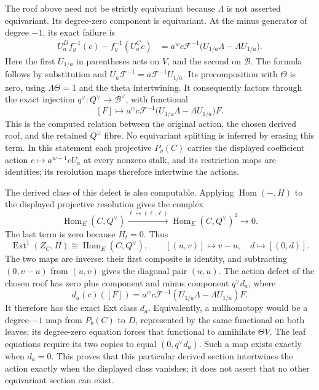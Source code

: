 The roof above need not be strictly equivariant because \(\Lambda\) is
not asserted equivariant. Its degree-zero component is equivariant. At
the minus generator of degree \(-1\), its exact failure is \[
\begin{aligned}
U_a^{D}f_y^{-1}(c)-f_y^{-1}(U_a^{C}c)
&=a^w c\mathcal F^{-1}
\bigl(U_{1/a}\Lambda-\Lambda U_{1/a}\bigr).
\end{aligned}
\] Here the first \(U_{1/a}\) in parentheses acts on \(V\), and the
second on \(\mathscr B\). The formula follows by substitution and
\(U_a\mathcal F^{-1}=a\mathcal F^{-1}U_{1/a}\). Its precomposition with
\(\Theta\) is zero, using \(\Lambda\Theta=1\) and the theta
intertwining. It consequently factors through the exact injection
\(q^\vee:Q^\vee\to\mathscr B^\vee\), with functional \[
[F]\longmapsto a^w c\mathcal F^{-1}
\bigl(U_{1/a}\Lambda-\Lambda U_{1/a}\bigr)F.
\] This is the computed relation between the original action, the chosen
derived roof, and the retained \(Q^\vee\) fibre. No equivariant
splitting is inferred by erasing this term. In this statement each
projective \(P_v(C)\) carries the displayed coefficient action
\(c\mapsto a^{w-1}cU_a\) at every nonzero stalk, and its restriction
maps are identities; its resolution maps therefore intertwine the
actions.

The derived class of this defect is also computable. Applying
\(\operatorname{Hom}(-,H)\) to the displayed projective resolution gives
the complex \[
\operatorname{Hom}_E(C,Q^\vee)
\xrightarrow{\ell\mapsto(\ell,\ell)}
\operatorname{Hom}_E(C,Q^\vee)^2
\longrightarrow0.
\] The last term is zero because \(H_t=0\). Thus \[
\operatorname{Ext}^1(Z_C,H)
\cong\operatorname{Hom}_E(C,Q^\vee),
\qquad[(u,v)]\longmapsto v-u,
\quad
d\longmapsto[(0,d)].
\] The two maps are inverse: their first composite is identity, and
subtracting \((0,v-u)\) from \((u,v)\) gives the diagonal pair
\((u,u)\). The action defect of the chosen roof has zero plus component
and minus component \(q^\vee d_a\), where \[
d_a(c)([F])=
a^w c\mathcal F^{-1}
(U_{1/a}\Lambda-\Lambda U_{1/a})F.
\] It therefore has the exact Ext class \(d_a\). Equivalently, a
nullhomotopy would be a degree-\(-1\) map from \(P_b(C)\) to \(D\),
represented by the same functional on both leaves; its degree-zero
equation forces that functional to annihilate \(\Theta V\). The leaf
equations require its two copies to equal \((0,q^\vee d_a)\). Such a map
exists exactly when \(d_a=0\). This proves that this particular derived
section intertwines the action exactly when the displayed class
vanishes; it does not assert that no other equivariant section can
exist.

